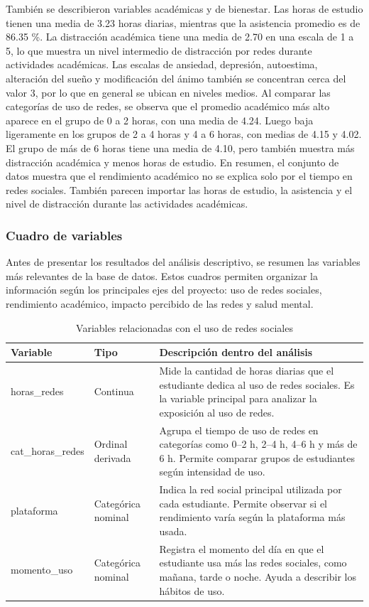 \documentclass[12pt]{article}
\begin{document}
También se describieron variables académicas y de bienestar. Las horas de estudio tienen una media de 3.23 horas diarias, mientras que la asistencia promedio es de 86.35 \%. La distracción académica tiene una media de 2.70 en una escala de 1 a 5, lo que muestra un nivel intermedio de distracción por redes durante actividades académicas. Las escalas de ansiedad, depresión, autoestima, alteración del sueño y modificación del ánimo también se concentran cerca del valor 3, por lo que en general se ubican en niveles medios. Al comparar las categorías de uso de redes, se observa que el promedio académico más alto aparece en el grupo de 0 a 2 horas, con una media de 4.24. Luego baja ligeramente en los grupos de 2 a 4 horas y 4 a 6 horas, con medias de 4.15 y 4.02. El grupo de más de 6 horas tiene una media de 4.10, pero también muestra más distracción académica y menos horas de estudio. En resumen, el conjunto de datos muestra que el rendimiento académico no se explica solo por el tiempo en redes sociales. También parecen importar las horas de estudio, la asistencia y el nivel de distracción durante las actividades académicas.

\subsubsection{Cuadro de variables}

Antes de presentar los resultados del análisis descriptivo, se resumen las variables más relevantes de la base de datos. Estos cuadros permiten organizar la información según los principales ejes del proyecto: uso de redes sociales, rendimiento académico, impacto percibido de las redes y salud mental. 

\begin{table}[H]
\centering
\caption{Variables relacionadas con el uso de redes sociales}
\label{tab:variables_redes}
\begin{tabular}{p{4cm} p{3cm} p{7cm}}
\toprule
\textbf{Variable} & \textbf{Tipo} & \textbf{Descripción dentro del análisis} \\
\midrule
horas\_redes & Continua & Mide la cantidad de horas diarias que el estudiante dedica al uso de redes sociales. Es la variable principal para analizar la exposición al uso de redes. \\

cat\_horas\_redes & Ordinal derivada & Agrupa el tiempo de uso de redes en categorías como 0--2 h, 2--4 h, 4--6 h y más de 6 h. Permite comparar grupos de estudiantes según intensidad de uso. \\

plataforma & Categórica nominal & Indica la red social principal utilizada por cada estudiante. Permite observar si el rendimiento varía según la plataforma más usada. \\

momento\_uso & Categórica nominal & Registra el momento del día en que el estudiante usa más las redes sociales, como mañana, tarde o noche. Ayuda a describir los hábitos de uso. \\
\bottomrule
\end{tabular}
\end{table}
\end{document}
